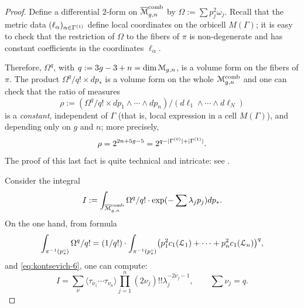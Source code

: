 \begin{proof}
  Define a differential $2$-form on $\overline{\mathcal{M}}\sp{\text{comb}}_{g,n}$ by $\Omega := \sum
  p_j^2 \omega_j$. Recall that the metric data $(\ell_\alpha)_{\alpha \in \Gamma^{(1)}}$
  define local coordinates on the orbicell $M(\Gamma)$; it is easy to check
  that the restriction of $\Omega$ to the fibers of $\pi$ is non-degenerate
  and has constant coefficients in the coordinates $\ell_\alpha$. 
  
  Therefore, $\Omega^q$, with $q := 3g -3 + n = \dim \mathcal{M}_{g,n}$, is a
  volume form on the fibers of $\pi$.  The product $\Omega^q/q! \times
  dp_*$ is a volume form on the whole $\mathcal{M}\sp{\text{comb}}_{g,n}$ and one can check
  that the ratio of measures
  \begin{equation*}
    \rho := (\Omega^q/q! \times {dp_1 \land \cdots \land dp_n}) / (d\ell_1 \land \cdots \land d\ell_N) 
  \end{equation*}
  is a \emph{constant}, independent of $\Gamma$ (that is, local expression
  in a cell $M(\Gamma)$), and depending only on $g$ and $n$; more precisely,
  \begin{equation*}
    \rho = 2^{2n + 5g - 5} = 2^{q - \lvert\Gamma^{(0)}\rvert + \lvert\Gamma^{(1)}\rvert}.
  \end{equation*}
  The proof of this last fact is quite technical and intricate: see
  \cite[Appendix C]{kontsevich;intersection-theory;1992}.

  Consider the integral
  \begin{equation*}
    I := \int_{\overline{\mathcal{M}}\sp{\text{comb}}_{g,n}} \Omega^q/q! \cdot \exp(-\sum \lambda_j p_j) dp_*.
  \end{equation*}
  On the one hand, from formula
  \begin{equation*}
    \int_{\pi^{-1}(p^\circ_*)} \Omega^q/q! = (1/q!) \cdot \int_{\pi^{-1}(p^\circ_*)} \bigl( p_1^2
    c_1({\mathcal{L}}_1) + \cdots + p_n^2 c_1({\mathcal{L}}_n) \bigr)^q,
  \end{equation*}
  and \eqref{eq:kontsevich-6}, one can compute:
  \begin{equation}
    \label{eq:8}
    I = \sum_\nu \langle \tau_{\nu_1} \cdots \tau_{\nu_n} \rangle \prod_{j=1}^n (2\nu_j)!!
    \lambda_j^{-2\nu_j -1}, \qquad \sum \nu_j = q.
  \end{equation}


\end{proof}

